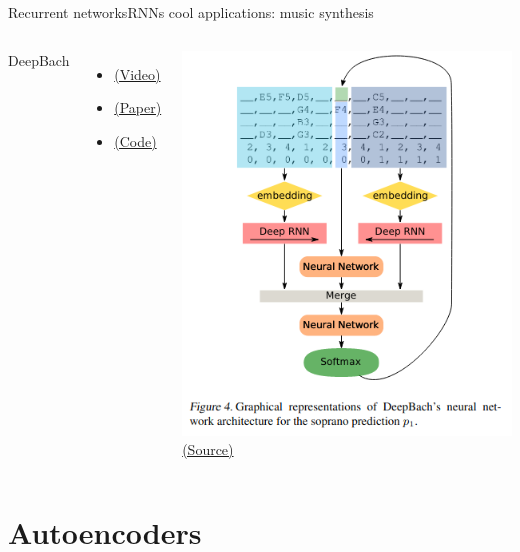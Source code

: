 \documentclass[10pt,compress]{beamer} %
\begin{document}
\begin{frame}{Recurrent networks}{RNNs cool applications: music synthesis} 
    \begin{columns}
	DeepBach
    \begin{itemize}
        \item \href{https://www.youtube.com/watch?v=QiBM7-5hA6o}{(Video)}
        \item \href{http://proceedings.mlr.press/v70/hadjeres17a/hadjeres17a.pdf}{(Paper)}
        \item \href{https://github.com/Ghadjeres/DeepBach}{(Code)}
    \end{itemize}
            \centering \includegraphics[width=\textwidth]{figs/bach.png}\\
	        \scriptsize\href{http://proceedings.mlr.press/v70/hadjeres17a/hadjeres17a.pdf}{(Source)}
    \end{columns}
\end{frame}


\section{Autoencoders}
\end{document}
